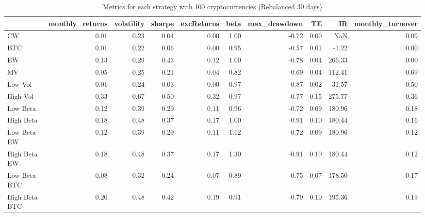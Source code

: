 \begin{table}
\centering
\caption{Metrics for each strategy with 100 cryptocurrencies (Rebalanced 30 days)}
\label{metrics100_30}
\begin{tabular}{lrrrrrrrrr}
\toprule
{} &  monthly\_returns &  volatility &  sharpe &  excReturns &  beta &  max\_drawdown &   TE &     IR &  monthly\_turnover \\
\midrule
CW            &             0.01 &        0.23 &    0.04 &        0.00 &  1.00 &         -0.72 & 0.00 &    NaN &              0.09 \\
BTC           &             0.01 &        0.22 &    0.06 &        0.00 &  0.95 &         -0.57 & 0.01 &  -1.22 &              0.00 \\
EW            &             0.13 &        0.29 &    0.43 &        0.12 &  1.00 &         -0.78 & 0.04 & 266.33 &              0.00 \\
MV            &             0.05 &        0.25 &    0.21 &        0.04 &  0.82 &         -0.69 & 0.04 & 112.41 &              0.69 \\
Low Vol       &             0.01 &        0.24 &    0.03 &       -0.00 &  0.97 &         -0.87 & 0.02 &  31.57 &              0.50 \\
High Vol      &             0.33 &        0.67 &    0.50 &        0.32 &  0.97 &         -0.77 & 0.15 & 275.77 &              0.36 \\
Low Beta      &             0.12 &        0.39 &    0.29 &        0.11 &  0.96 &         -0.72 & 0.09 & 180.96 &              0.18 \\
High Beta     &             0.18 &        0.48 &    0.37 &        0.17 &  1.00 &         -0.91 & 0.10 & 180.44 &              0.16 \\
Low Beta EW   &             0.12 &        0.39 &    0.29 &        0.11 &  1.12 &         -0.72 & 0.09 & 180.96 &              0.12 \\
High Beta EW  &             0.18 &        0.48 &    0.37 &        0.17 &  1.30 &         -0.91 & 0.10 & 180.44 &              0.12 \\
Low Beta BTC  &             0.08 &        0.32 &    0.24 &        0.07 &  0.89 &         -0.75 & 0.07 & 178.50 &              0.17 \\
High Beta BTC &             0.20 &        0.48 &    0.42 &        0.19 &  0.91 &         -0.79 & 0.10 & 195.36 &              0.19 \\
\bottomrule
\end{tabular}
\end{table}

